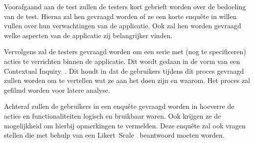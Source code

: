 \bigskip

Voorafgaand aan de test zullen de testers kort gebrieft worden over de bedoeling van de test. Hierna zal hen gevraagd worden of ze een korte enquête in willen vullen over hun verwachtingen van de applicatie. Ook zal hen worden gevraagd welke aspecten van de applicatie zij belangrijker vinden.

Vervolgens zal de testers gevraagd worden om een serie met (nog te specificeren) acties te verrichten binnen de applicatie. Dit wordt gedaan in de vorm van een Contextual Inquiry~\cite{holtzblatt1993contextual}. Dit houdt in dat de gebruikers tijdens dit proces gevraagd zullen worden om te vertellen wat ze aan het doen zijn en waarom. Het proces zal gefilmd worden voor latere analyse.

Achteraf zullen de gebruikers in een enquête gevraagd worden in hoeverre de acties en functionaliteiten logisch en bruikbaar waren. Ook krijgen ze de mogelijkheid om hierbij opmerkingen te vermelden. Deze enquête zal ook vragen stellen die met behulp van een Likert~Scale~\cite{likert1932technique} beantwoord moeten worden.